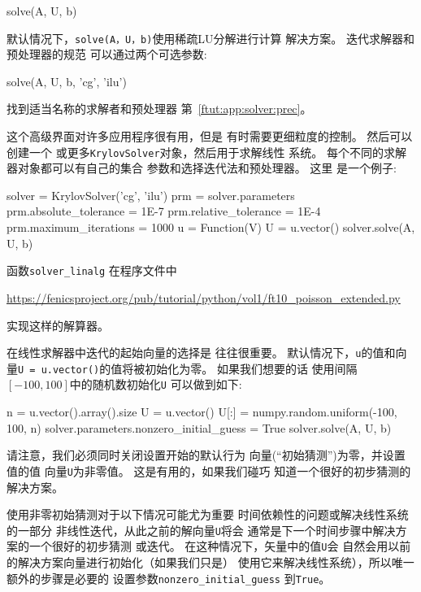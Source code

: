 \begin{python}
solve(A, U, b)
\end{python}

默认情况下，\texttt{solve(A，U，b)}使用稀疏LU分解进行计算
解决方案。 迭代求解器和预处理器的规范
可以通过两个可选参数:

\begin{python}
solve(A, U, b, 'cg', 'ilu')
\end{python}
找到适当名称的求解者和预处理器
第~\ref{ftut:app:solver:prec}。


这个高级界面对许多应用程序很有用，但是
有时需要更细粒度的控制。 然后可以创建一个
或更多\texttt{KrylovSolver}对象，然后用于求解线性
系统。 每个不同的求解器对象都可以有自己的集合
参数和选择迭代法和预处理器。 这里
是一个例子:

\begin{python}
solver = KrylovSolver('cg', 'ilu')
prm = solver.parameters
prm.absolute_tolerance = 1E-7
prm.relative_tolerance = 1E-4
prm.maximum_iterations = 1000
u = Function(V)
U = u.vector()
solver.solve(A, U, b)
\end{python}
函数\verb!solver_linalg! 在程序文件中
\begin{center}
\url{https://fenicsproject.org/pub/tutorial/python/vol1/ft10_poisson_extended.py}
\end{center}
实现这样的解算器。

在线性求解器中迭代的起始向量的选择是
往往很重要。 默认情况下，\texttt{u}的值和向量\texttt{U = u.vector()}的值将被初始化为零。 如果我们想要的话
使用间隔$[ - 100,100]$中的随机数初始化\texttt{U}
可以做到如下:

\begin{python}
n = u.vector().array().size
U = u.vector()
U[:] = numpy.random.uniform(-100, 100, n)
solver.parameters.nonzero_initial_guess = True
solver.solve(A, U, b)
\end{python}
请注意，我们必须同时关闭设置开始的默认行为
向量(``初始猜测'')为零，并设置值的值
向量\texttt{U}为非零值。 这是有用的，如果我们碰巧
知道一个很好的初步猜测的解决方案。

使用非零初始猜测对于以下情况可能尤为重要
时间依赖性的问题或解决线性系统的一部分
非线性迭代，从此之前的解向量\texttt{U}将会
通常是下一个时间步骤中解决方案的一个很好的初步猜测
或迭代。 在这种情况下，矢量中的值\texttt{U}会
自然会用以前的解决方案向量进行初始化（如果我们只是）
使用它来解决线性系统），所以唯一额外的步骤是必要的
设置参数\verb!nonzero_initial_guess! 到\texttt{True}。

